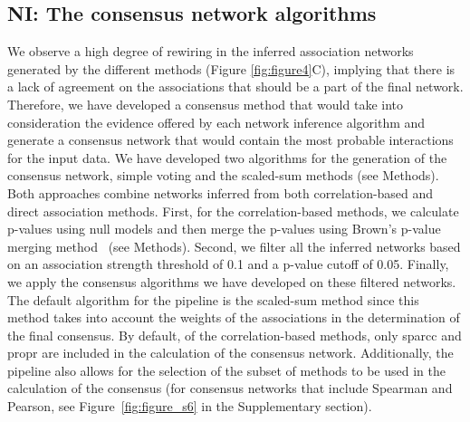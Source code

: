   \FloatBarrier

  \subsection*{NI: The consensus network algorithms}

  We observe a high degree of rewiring in the inferred association networks generated by the different methods (Figure \ref{fig:figure4}C), implying that there is a lack of agreement on the associations that should be a part of the final network.
  Therefore, we have developed a consensus method that would take into consideration the evidence offered by each network inference algorithm and generate a consensus network that would contain the most probable interactions for the input data.
  We have developed two algorithms for the generation of the consensus network, simple voting and the scaled-sum methods (see Methods).
  Both approaches combine networks inferred from both correlation-based and direct association methods.
  First, for the correlation-based methods, we calculate p-values using null models and then merge the p-values using Brown's p-value merging method~\cite{Poole_Gibbs_Shmulevich_Bernard_Knijnenburg_2016,faustCoNetAppInference2016} (see Methods).
  Second, we filter all the inferred networks based on an association strength threshold of 0.1 and a p-value cutoff of 0.05.
  Finally, we apply the consensus algorithms we have developed on these filtered networks.
  The default algorithm for the pipeline is the scaled-sum method since this method takes into account the weights of the associations in the determination of the final consensus.
  By default, of the correlation-based methods, only \acs{sparcc} and propr are included in the calculation of the consensus network.
  Additionally, the pipeline also allows for the selection of the subset of methods to be used in the calculation of the consensus (for consensus networks that include Spearman and Pearson, see Figure~\ref{fig:figure_s6} in the Supplementary section).

